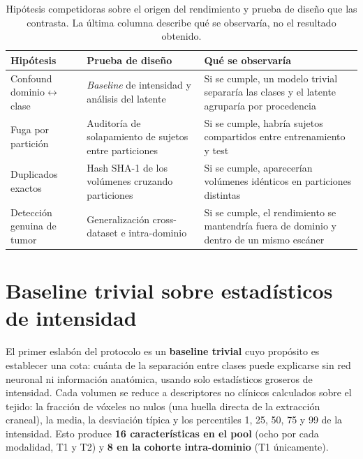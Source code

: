 \begin{table}[ht]
  \centering
  \caption[Hipótesis y pruebas del protocolo de auditoría]{Hipótesis
  competidoras sobre el origen del rendimiento y prueba de diseño que las
  contrasta. La última columna describe qué se observaría, no el resultado
  obtenido.}
  \label{tab:protocolo}
  \begin{tabular}{p{3.4cm} p{4.2cm} p{4.6cm}}
    \hline
    \textbf{Hipótesis} & \textbf{Prueba de diseño} & \textbf{Qué se observaría} \\
    \hline
    Confound dominio$\leftrightarrow$clase &
    \emph{Baseline} de intensidad y análisis del latente &
    Si se cumple, un modelo trivial separaría las clases y el latente agruparía por procedencia \\
    Fuga por partición &
    Auditoría de solapamiento de sujetos entre particiones &
    Si se cumple, habría sujetos compartidos entre entrenamiento y test \\
    Duplicados exactos &
    Hash SHA-1 de los volúmenes cruzando particiones &
    Si se cumple, aparecerían volúmenes idénticos en particiones distintas \\
    Detección genuina de tumor &
    Generalización cross-dataset e intra-dominio &
    Si se cumple, el rendimiento se mantendría fuera de dominio y dentro de un mismo escáner \\
    \hline
  \end{tabular}
\end{table}

\section{Baseline trivial sobre estadísticos de intensidad}

El primer eslabón del protocolo es un \textbf{baseline trivial} cuyo propósito
es establecer una cota: cuánta de la separación entre clases puede explicarse
sin red neuronal ni información anatómica, usando solo estadísticos groseros de
intensidad. Cada volumen se reduce a descriptores no clínicos calculados sobre
el tejido: la fracción de vóxeles no nulos (una huella directa de la extracción
craneal), la media, la desviación típica y los percentiles 1, 25, 50, 75 y 99 de
la intensidad. Esto produce \textbf{16 características en el pool} (ocho por cada
modalidad, T1 y T2) y \textbf{8 en la cohorte intra-dominio} (T1 únicamente).

